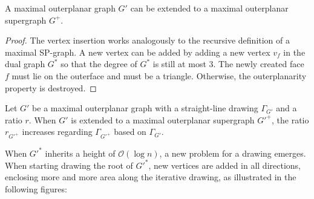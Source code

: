 \begin{lemma}
	A maximal outerplanar graph $G'$ can be extended to a maximal outerplanar supergraph $G^+$.\label{l:outerplanar-supergraph}
\end{lemma}
\begin{proof}
	The vertex insertion works analogously to the recursive definition of a maximal SP-graph. A new vertex can be added by adding a new vertex $v_f$ in the dual graph $G^*$ so that the degree of $G^*$ is still at most 3. The newly created face $f$ must lie on the outerface and must be a triangle. Otherwise, the outerplanarity property is destroyed. 
\end{proof}

\begin{observation}
	Let $G'$ be a maximal outerplanar graph with a straight-line drawing $\Gamma_{G'}$ and a ratio $r$. When $G'$ is extended to a maximal outerplanar supergraph $G'^+$, the ratio $r_{G'^+}$ increases regarding $\Gamma_{G'^+}$ based on $\Gamma_{G'}$.\label{ob:area_leads_to_ratio_increase}
\end{observation}
When $G'^*$ inherits a height of $\mathcal{O}(\log n)$, a new problem for a drawing emerges. When starting drawing the root of $G'^*$, new vertices are added in all directions, enclosing more and more area along the iterative drawing, as illustrated in the following figures:
